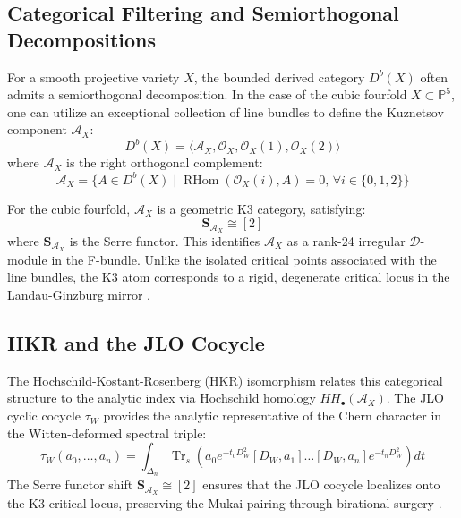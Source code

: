 \documentclass[12pt,reqno]{amsart}
\theoremstyle{remark} \newtheorem{remark}[theorem]{Remark}
\begin{document}
\subsection{Categorical Filtering and Semiorthogonal Decompositions}
For a smooth projective variety $X$, the bounded derived category
$D^b(X)$ often admits a semiorthogonal decomposition. In the case of
the cubic fourfold $X \subset \mathbb{P}^5$, one can utilize an
exceptional collection of line bundles to define the Kuznetsov
component $\mathcal{A}_X$:
\begin{equation}
    D^b(X) = \langle \mathcal{A}_X, \mathcal{O}_X, \mathcal{O}_X(1),
    \mathcal{O}_X(2) \rangle
\end{equation}
where $\mathcal{A}_X$ is the right orthogonal complement:
\begin{equation}
    \mathcal{A}_X = \{ A \in D^b(X) \mid
    \operatorname{RHom}(\mathcal{O}_X(i), A) = 0, \, \forall i \in
    \{0,1,2\} \}
\end{equation}

\noindent For the cubic fourfold, $\mathcal{A}_X$ is a
geometric K3 category, satisfying:
\begin{equation}
    \mathbf{S}_{\mathcal{A}_X} \cong [2]
\end{equation}
\noindent where $\mathbf{S}_{\mathcal{A}_X}$ is the Serre functor.  This identifies $\mathcal{A}_X$ as a rank-24 irregular
$\mathcal{D}$-module in the F-bundle. Unlike the isolated critical
points associated with the line bundles, the K3 atom corresponds to a
rigid, degenerate critical locus in the Landau-Ginzburg mirror
\cite{Addington2014, Kuznetsov2007}.

\subsection{HKR and the JLO Cocycle}
The Hochschild-Kostant-Rosenberg (HKR) isomorphism relates this
categorical structure to the analytic index via Hochschild homology
$HH_\bullet(\mathcal{A}_X)$. The JLO cyclic cocycle $\tau_W$ provides
the analytic representative of the Chern character in the
Witten-deformed spectral triple:
\begin{equation}
    \tau_W(a_0, \dots, a_n) = \int_{\Delta_n} \operatorname{Tr}_s
    \left( a_0 e^{-t_0 D_W^2} [D_W, a_1] \dots [D_W, a_n] e^{-t_n
      D_W^2} \right) dt
\end{equation}
The Serre functor shift $\mathbf{S}_{\mathcal{A}_X} \cong [2]$ ensures that the
JLO cocycle localizes onto the K3 critical locus, preserving the Mukai
pairing through birational surgery \cite{GetzlerSzenes1989, Mukai1987}.
\end{document}
